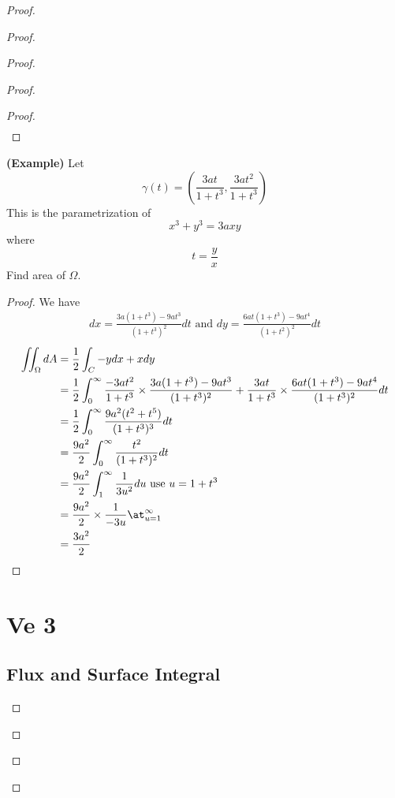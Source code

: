 \documentclass{report}
\begin{document}
\begin{proof}
\begin{proof}
\begin{proof}
\begin{proof}
\begin{proof}
\begin{align*}
\end{align*}
\end{proof}
\begin{theorem}
\label{9.3.15}
\textbf{(Example)} Let
\begin{equation*}
\gamma (t)=(\frac{3at}{1+t^3},\frac{3at^2}{1+t^3})
\end{equation*}
This is the parametrization of
\begin{equation*}
x^3+y^3=3axy
\end{equation*}
where 
\begin{equation*}
t=\frac{y}{x}
\end{equation*}
Find area of $\Omega$.
\end{theorem}
\begin{proof}
We have
\begin{align*}
dx=\frac{3a(1+t^3)-9at^3}{(1+t^3)^2}dt\text{ and }dy=\frac{6at(1+t^3)-9at^4}{(1+t^2)^2}dt
\end{align*}
\begin{align*}
\iint_{\Omega} dA&=\frac{1}{2}\int_C -ydx+xdy\\
&=\frac{1}{2}\int_0^\infty \frac{-3at^2}{1+t^3}\times \frac{3a(1+t^3)-9at^3}{(1+t^3)^2}+\frac{3at}{1+t^3}\times \frac{6at(1+t^3)-9at^4}{(1+t^3)^2}dt\\
&=\frac{1}{2}\int_0^\infty \frac{9a^2 (t^2+t^5)}{(1+t^3)^3}dt\\
&=\frac{9a^2}{2}\int_0^\infty \frac{t^2}{(1+t^3)^2}dt\\
&=\frac{9a^2}{2}\int_1^\infty \frac{1}{3u^2}du\text{ use $u=1+t^3$ }\\
&=\frac{9a^2}{2}\times \frac{1}{-3u}\at_{u=1}^\infty\\
&=\frac{3a^2}{2}
\end{align*}
\end{proof}
\chapter{Ve 3}
\section{Flux and Surface Integral}


\end{proof}
\end{proof}
\end{proof}
\end{proof}
\end{document}
